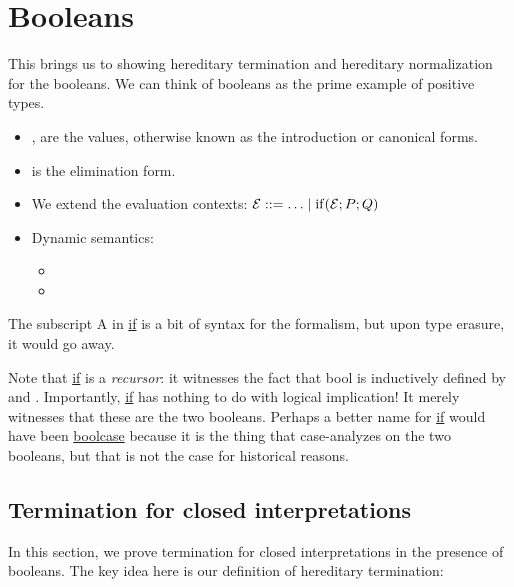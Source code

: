 \documentclass{article}
\begin{document}
\section{Booleans}
This brings us to showing hereditary termination and hereditary normalization for the booleans. We can think of booleans as the prime example of positive types.

\begin{itemize}
    \item \true{}, \false{} are the values, otherwise known as the introduction or canonical forms.
    \item {} is the elimination form.
    \item We extend the evaluation contexts: $\mathcal{E} ::= \ldots \mid \mathrm{if}(\mathcal{E}; P; Q)$
    \item Dynamic semantics:
    \begin{itemize}
                \item {}
                \item {}
        \end{itemize}
\end{itemize}


The subscript A in \underline{if} is a bit of syntax for the formalism, but upon type erasure, it would go away.

Note that \underline{if} is a \textit{recursor}: it witnesses the fact that bool is inductively defined by \true{} and \false{}. Importantly, \underline{if} has nothing to do with logical implication! It merely witnesses that these are the two booleans. Perhaps a better name for \underline{if} would have been \underline{boolcase} because it is the thing that case-analyzes on the two booleans, but that is not the case for historical reasons.

\subsection{Termination for closed interpretations}
In this section, we prove termination for closed interpretations in the presence of booleans. The key idea here is our definition of hereditary termination:
\end{document}
